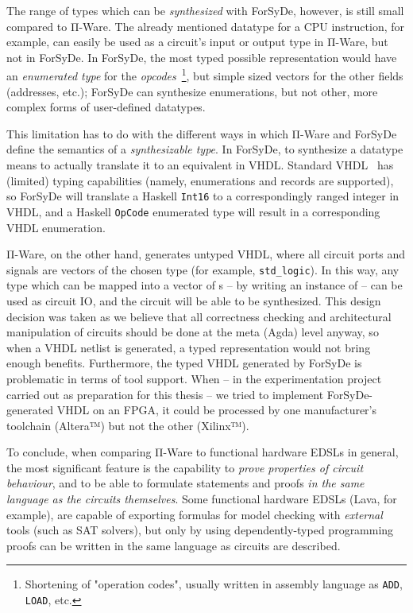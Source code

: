         The range of types which can be \emph{synthesized} with ForSyDe, however, is still small
        compared to Π-Ware. The already mentioned datatype for a CPU instruction, for example, can
        easily be used as a circuit's input or output type in Π-Ware, but not in ForSyDe.
        In ForSyDe, the most typed possible representation would have an \emph{enumerated type} for the
        \emph{opcodes}~\footnote{Shortening of "operation codes",
            usually written in assembly language as \texttt{ADD}, \texttt{LOAD}, etc.},
        but simple sized vectors for the other fields (addresses, etc.);
        ForSyDe can synthesize enumerations, but not other, more complex forms of user-defined datatypes.

        This limitation has to do with the different ways in which Π-Ware and ForSyDe define
        the semantics of a \emph{synthesizable type}.
        In ForSyDe, to synthesize a datatype means to actually translate it to an equivalent in \ac{VHDL}.
        Standard \ac{VHDL}~\cite{vhdl-standard} has (limited) typing capabilities
        (namely, enumerations and records are supported), so ForSyDe will translate
        a Haskell \texttt{Int16} to a correspondingly ranged integer in VHDL,
        and a Haskell \texttt{OpCode} enumerated type will result in a corresponding
        \ac{VHDL} enumeration.

        Π-Ware, on the other hand, generates untyped \ac{VHDL}, where all circuit ports and signals
        are vectors of the chosen  type (for example, \texttt{std_logic}).
        In this way, any type which can be mapped into a vector of s – by writing an
        instance of  – can be used as circuit IO, and the circuit will be able to be synthesized.
        This design decision was taken as we believe that all correctness checking and architectural
        manipulation of circuits should be done at the meta (Agda) level anyway,
        so when a \ac{VHDL} netlist is generated, a typed representation would not bring enough benefits.
        Furthermore, the typed \ac{VHDL} generated by ForSyDe is problematic in terms of tool support.
        When – in the experimentation project~\cite{functional-hardware-survey} carried out as preparation
        for this thesis – we tried to implement ForSyDe-generated \ac{VHDL} on an \ac{FPGA},
        it could be processed by one manufacturer's toolchain (Altera™) but not the other (Xilinx™).

        To conclude, when comparing Π-Ware to functional hardware \acp{EDSL} in general,
        the most significant feature is the capability to \emph{prove properties of circuit behaviour},
        and to be able to formulate statements and proofs
        \emph{in the same language as the circuits themselves}.
        Some functional hardware \acp{EDSL} (Lava, for example), are capable of exporting formulas
        for model checking with \emph{external} tools (such as SAT solvers), but only by using
        dependently-typed programming proofs can be written in the same language as circuits are described.

